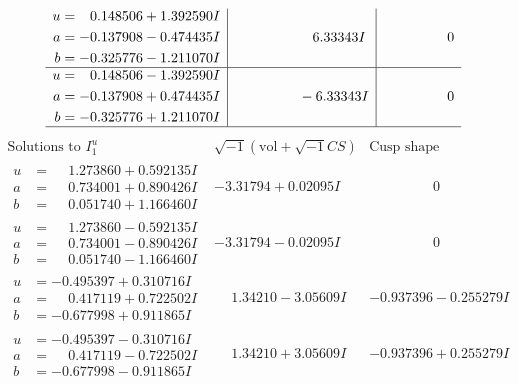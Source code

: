 \documentclass[1p]{elsarticle_modified}
\theoremstyle{definition}
\newcommand{\I}{\sqrt{-1}}
\begin{document}
$$\begin{array}{c|c|c}
\begin{aligned}
u &= \phantom{-}0.148506 + 1.392590 I \\
a &= -0.137908 - 0.474435 I \\
b &= -0.325776 - 1.211070 I\end{aligned}
 & \phantom{-0.000000 -}6.33343 I & \phantom{-0.000000 } 0 \\ \hline\begin{aligned}
u &= \phantom{-}0.148506 - 1.392590 I \\
a &= -0.137908 + 0.474435 I \\
b &= -0.325776 + 1.211070 I\end{aligned}
 & \phantom{-0.000000 } -6.33343 I & \phantom{-0.000000 } 0\\
 \hline 
 \end{array}$$\newpage$$\begin{array}{c|c|c}  
\text{Solutions to }I^u_{1}& \I (\text{vol} + \sqrt{-1}CS) & \text{Cusp shape}\\
 \hline 
\begin{aligned}
u &= \phantom{-}1.273860 + 0.592135 I \\
a &= \phantom{-}0.734001 + 0.890426 I \\
b &= \phantom{-}0.051740 + 1.166460 I\end{aligned}
 & -3.31794 + 0.02095 I & \phantom{-0.000000 } 0 \\ \hline\begin{aligned}
u &= \phantom{-}1.273860 - 0.592135 I \\
a &= \phantom{-}0.734001 - 0.890426 I \\
b &= \phantom{-}0.051740 - 1.166460 I\end{aligned}
 & -3.31794 - 0.02095 I & \phantom{-0.000000 } 0 \\ \hline\begin{aligned}
u &= -0.495397 + 0.310716 I \\
a &= \phantom{-}0.417119 + 0.722502 I \\
b &= -0.677998 + 0.911865 I\end{aligned}
 & \phantom{-}1.34210 - 3.05609 I & -0.937396 - 0.255279 I \\ \hline\begin{aligned}
u &= -0.495397 - 0.310716 I \\
a &= \phantom{-}0.417119 - 0.722502 I \\
b &= -0.677998 - 0.911865 I\end{aligned}
 & \phantom{-}1.34210 + 3.05609 I & -0.937396 + 0.255279 I \\ \hline\begin{aligned}

\end{aligned}
\end{array}$$
\end{document}
